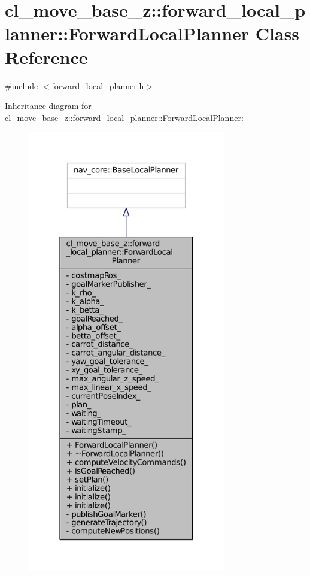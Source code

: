 \hypertarget{classcl__move__base__z_1_1forward__local__planner_1_1ForwardLocalPlanner}{}\section{cl\+\_\+move\+\_\+base\+\_\+z\+:\+:forward\+\_\+local\+\_\+planner\+:\+:Forward\+Local\+Planner Class Reference}
\label{classcl__move__base__z_1_1forward__local__planner_1_1ForwardLocalPlanner}


{\ttfamily \#include $<$forward\+\_\+local\+\_\+planner.\+h$>$}



Inheritance diagram for cl\+\_\+move\+\_\+base\+\_\+z\+:\+:forward\+\_\+local\+\_\+planner\+:\+:Forward\+Local\+Planner\+:
\nopagebreak
\begin{figure}[H]
\begin{center}
\leavevmode
\includegraphics[height=550pt]{classcl__move__base__z_1_1forward__local__planner_1_1ForwardLocalPlanner__inherit__graph}
\end{center}
\end{figure}


